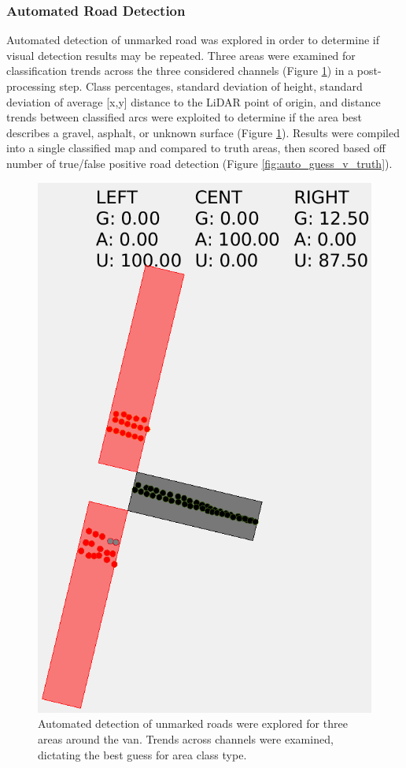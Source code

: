 \documentclass[numbered,pdftex]{ohio-etd}
\begin{document}
{{{{{			}
			
			\subsubsection{Automated Road Detection}\label{sec:auto_road_detection}{
				
				{Automated detection of unmarked road was explored in order to determine if visual detection results may be repeated. Three areas were examined for classification trends across the three considered channels (Figure \ref{fig:auto_guess_areas}) in a post-processing step. Class percentages, standard deviation of height, standard deviation of average [x,y] distance to the LiDAR point of origin, and distance trends between classified arcs were exploited to determine if the area best describes a gravel, asphalt, or unknown surface (Figure \ref{fig:auto_guess_areas}). Results were compiled into a single classified map and compared to truth areas, then scored based off number of true/false positive road detection (Figure \ref{fig:auto_guess_v_truth}).}	
				
				\begin{figure}[H]
					\centering
					\includegraphics[width=0.5\linewidth]{Defense_Images/auto_guess_areas}
					\caption[Projected Automated Guess vs Truth]{Automated detection of unmarked roads were explored for three areas around the van. Trends across channels were examined, dictating the best guess for area class type. }
					\label{fig:auto_guess_areas}
				\end{figure}
				
}}}}}
\end{document}
